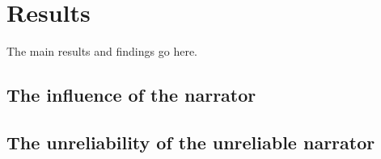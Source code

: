 \section{Results}
The main results and findings go here.









\subsection{The influence of the narrator}


\subsection{The unreliability of the unreliable narrator}

